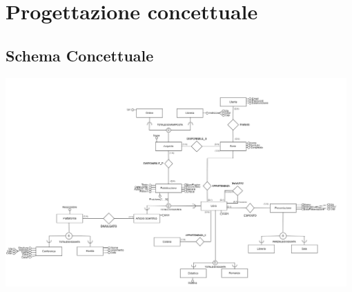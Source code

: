 \chapter{Progettazione concettuale}

    
    \section{Schema Concettuale}
        \begin{flushleft}
            \includegraphics[width=0.98\textwidth]{Immagini/DiagrammaErNonRistrutturato.png}
        \end{flushleft}
\newpage

